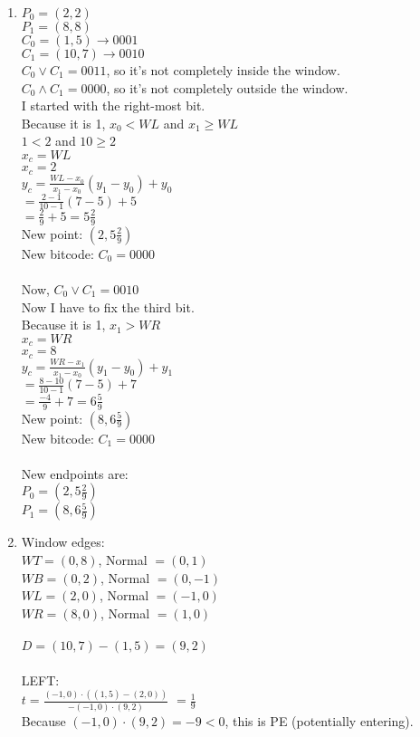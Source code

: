 \documentclass[12pt]{article}
\begin{document}
\begin{enumerate}
\item
$P_0 = (2, 2)$ \\
$P_1 = (8, 8)$ \\
$C_0 = (1, 5) \rightarrow 0001$ \\
$C_1 = (10, 7) \rightarrow 0010$ \\
$C_0 \vee C_1 = 0011$, so it's not completely inside the window. \\
$C_0 \wedge C_1 = 0000$, so it's not completely outside the window. \\
I started with the right-most bit.  \\
Because it is 1, $x_0 < WL$ and $x_1 \geq WL$ \\
$1 < 2$ and $10 \geq 2$ \\
$x_c = WL$ \\
$x_c = 2$ \\
$y_c = \frac{WL - x_0}{x_1 - x_0}(y_1 - y_0) + y_0$ \\
$= \frac{2-1}{10-1}(7-5) + 5$ \\
$= \frac{2}{9} + 5 = 5\frac{2}{9}$ \\
New point: $(2, 5\frac{2}{9})$ \\
New bitcode: $C_0 = 0000$ \\ \\
Now, $C_0 \vee C_1 = 0010$ \\
Now I have to fix the third bit. \\
Because it is 1, $x_1 > WR$ \\
$x_c = WR$ \\
$x_c = 8$ \\
$y_c = \frac{WR - x_1}{x_1 - x_0}(y_1 - y_0) + y_1$ \\
$= \frac{8-10}{10-1}(7-5) + 7$ \\
$= \frac{-4}{9} + 7 = 6\frac{5}{9}$ \\
New point: $(8, 6\frac{5}{9})$ \\
New bitcode: $C_1 = 0000$  \\ \\
New endpoints are: \\
$P_0 = (2, 5\frac{2}{9})$ \\
$P_1 = (8, 6\frac{5}{9})$ 

\item
Window edges: \\
$WT = (0, 8)$, Normal $= (0, 1)$ \\
$WB = (0, 2)$, Normal $= (0, -1)$ \\
$WL = (2, 0)$, Normal $= (-1, 0)$ \\
$WR = (8, 0)$, Normal $= (1, 0)$ \\ \\
$D = (10, 7) - (1, 5) = (9, 2)$ \\ \\
LEFT: \\
$t = \frac{(-1, 0) \cdot ((1, 5) - (2, 0))}{-(-1, 0) \cdot (9, 2)}$
$ = \frac{1}{9}$ \\
Because $(-1, 0) \cdot (9, 2) = -9 < 0$, this is PE (potentially entering). \\ \\


\end{enumerate}
\end{document}
